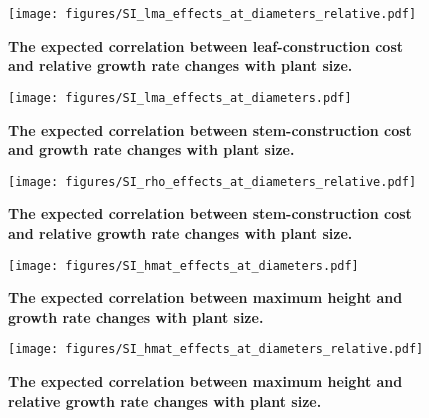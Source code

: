 \documentclass[12pt, a4paper]{article}
\makeatletter
\def\maxwidth{\ifdim\Gin@nat@width>\linewidth\linewidth
\else\Gin@nat@width\fi}
\let\Oldincludegraphics\includegraphics
\renewcommand{\includegraphics}[1]{\Oldincludegraphics[width=\maxwidth]{#1}}
\makeatother
\begin{document}
\begin{appendices}
\begin{figure}[htbp]
\centering
\texttt{[image: figures/SI\_lma\_effects\_at\_diameters\_relative.pdf]}
\caption{\textbf{The expected correlation between leaf-construction cost
and relative growth rate changes with plant size.}
\label{f-lma_growth_size_relative}}
\end{figure}

\begin{figure}[htbp]
\centering
\texttt{[image: figures/SI\_lma\_effects\_at\_diameters.pdf]}
\caption{\textbf{The expected correlation between stem-construction cost
and growth rate changes with plant size.} \label{f-rho_growth_size}}
\end{figure}

\begin{figure}[htbp]
\centering
\texttt{[image: figures/SI\_rho\_effects\_at\_diameters\_relative.pdf]}
\caption{\textbf{The expected correlation between stem-construction cost
and relative growth rate changes with plant size.}
\label{f-rho_growth_size_relative}}
\end{figure}

\begin{figure}[htbp]
\centering
\texttt{[image: figures/SI\_hmat\_effects\_at\_diameters.pdf]}
\caption{\textbf{The expected correlation between maximum height and
growth rate changes with plant size.} \label{f-rho_growth_size}}
\end{figure}

\begin{figure}[htbp]
\centering
\texttt{[image: figures/SI\_hmat\_effects\_at\_diameters\_relative.pdf]}
\caption{\textbf{The expected correlation between maximum height and
relative growth rate changes with plant size.}
\label{f-hmat_growth_size_relative}}
\end{figure}


\end{appendices}
\end{document}
